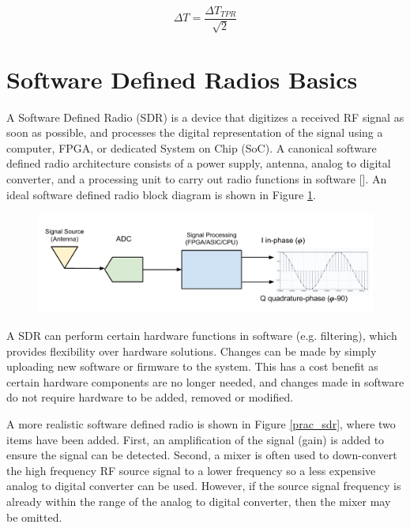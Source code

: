 \begin{equation}\label{correlating_neat}
\Delta T = \frac{\Delta T_{TPR}}{\sqrt{2}}
\end{equation}
 
\section{Software Defined Radios Basics} 
A Software Defined Radio (SDR) is a device that digitizes a received RF signal as soon as possible, and processes the digital representation of the signal using a computer, FPGA, or dedicated System on Chip (SoC).  A canonical software defined radio architecture consists of a power supply, antenna, analog to digital converter, and a processing unit to carry out radio functions in software [\cite{Mitola1995}]. An ideal software defined radio block diagram is shown in Figure \ref{ideal_sdr}.

{\begin{figure}[h!tb] 
\centering
\includegraphics[width=\textwidth]{Images/SDR_Ideal_block.pdf}
\label{ideal_sdr}
\end{figure}
}

A SDR can perform certain hardware functions in software (e.g. filtering), which provides flexibility over hardware solutions.  Changes can be made by simply uploading new software or firmware to the system.  This has a cost benefit as certain hardware components are no longer needed, and changes made in software do not require hardware to be added, removed or modified.

A more realistic software defined radio is shown in Figure \ref{prac_sdr}, where two items have been added.  First, an amplification of the signal (gain) is added to ensure the signal can be detected.  Second, a mixer is often used to down-convert the high frequency RF source signal to a lower frequency so a less expensive analog to digital converter can be used.  However, if the source signal frequency is already within the range of the analog to digital converter, then the mixer may be omitted.   

